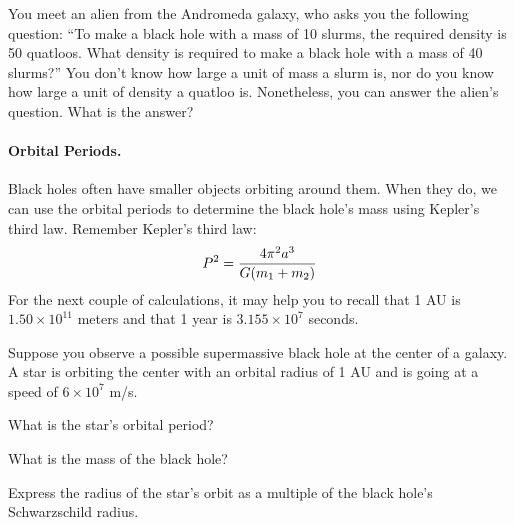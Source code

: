 \vskip 2in


You meet an alien from the Andromeda galaxy, who asks you the following
question: ``To make a black hole with a mass of 10 slurms, the required
density is 50 quatloos.  What density is required to make a black
hole with a mass of 40 slurms?''  You don't know how large a unit of 
mass a slurm is, nor do you know how large a unit of density a quatloo is.
Nonetheless, you can answer the alien's question.  What is the answer?

\vskip 2in



\paragraph{Orbital Periods.}
Black holes often have smaller objects orbiting around them.  When they do,
we can use the orbital periods to determine the black hole's mass
using Kepler's third law.  Remember Kepler's third law:
$$
P^2={4\pi^2a^3\over G(m_1+m_2)}
$$
For the next couple of calculations, it may help you to recall that
1 AU is $1.50\times 10^{11}$ meters and that 
1 year is $3.155\times 10^7$ seconds.

Suppose you observe a possible supermassive black hole at the center
of a galaxy.  A star is orbiting the center with an orbital radius of 1 AU
and is going at a speed of $6\times 10^7$ m/s.

What is the star's orbital period?

\vskip 2in

What is the mass of the black hole?

\vskip 2in

Express the radius of the star's orbit as a multiple of the 
black hole's Schwarzschild radius.  


